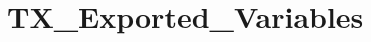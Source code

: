\hypertarget{group___t_x___exported___variables}{}\section{T\+X\+\_\+\+Exported\+\_\+\+Variables}
\label{group___t_x___exported___variables}
